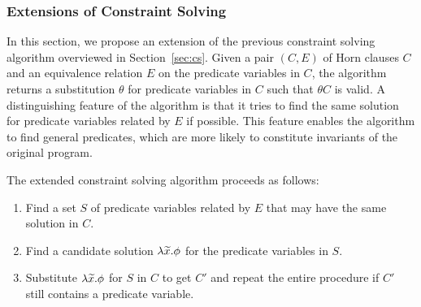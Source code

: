 \subsubsection{Extensions of Constraint Solving}
\label{sec:extcs}

In this section, we propose an extension of the previous constraint 
solving algorithm overviewed in Section~\ref{sec:cs}.  Given a pair 
\((C,E)\) of Horn clauses \(C\) and an equivalence relation \(E\) on the 
predicate variables in \(C\), the algorithm returns a substitution 
\(\theta\) for predicate variables in \(C\) such that \(\theta C\) is 
valid.  A distinguishing feature of the algorithm is that it tries to 
find the same solution for predicate variables related by \(E\) if 
possible.  This feature enables the algorithm to find general predicates, 
which are more likely to constitute invariants of the original program.


The extended constraint solving algorithm proceeds as follows:
\begin{enumerate}
\item Find a set \(S\) of predicate variables related by \(E\) that may 
have the same solution in \(C\).
\item Find a candidate solution \(\lambda \widetilde{x}.\phi\) for the 
predicate variables in \(S\).
\item Substitute \(\lambda \widetilde{x}.\phi\) for \(S\) in \(C\) to get 
\(C'\) and repeat the entire procedure if \(C'\) still contains a 
predicate variable.
\end{enumerate}


